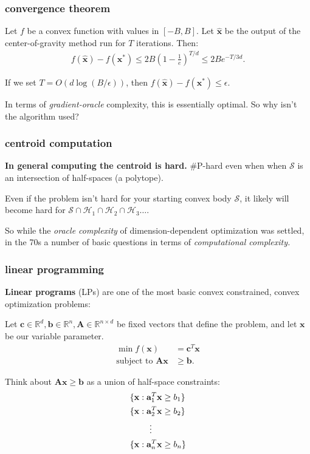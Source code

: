 \documentclass[compress]{beamer}
\newcommand{\bv}[1]{\mathbf{#1}}
\newcommand{\R}{\mathbb{R}}
\begin{document}
\begin{frame}[t]
	\frametitle{convergence theorem}
	\begin{theorem}
		Let $f$ be a convex function with values in $[-B,B]$.
		Let $\hat{\bv{x}}$ be the output of the center-of-gravity method run for $T$ iterations. Then:
		\begin{align*}
			f(\hat{\bv{x}}) - f(\bv{x}^*) \leq 2B \left(1-\frac{1}{e}\right)^{T/d} \leq 2B e^{-T/3d}.
		\end{align*}
	\end{theorem}
	If we set $T = O\left(d\log(B/\epsilon)\right)$, then $f(\hat{\bv{x}}) - f(\bv{x}^*) \leq \epsilon$. 

In terms of \emph{gradient-oracle} complexity, this is essentially optimal. So why isn't the algorithm used?
\end{frame}


\begin{frame}[t]
		\frametitle{centroid computation}
		\textbf{In general computing the centroid is hard.} \#P-hard even when when $\mathcal{S}$ is an intersection of half-spaces (a polytope).
		
		Even if the problem isn't hard for your starting convex body $\mathcal{S}$, it likely will become hard for $\mathcal{S} \cap \mathcal{H}_1  \cap \mathcal{H}_2 \cap \mathcal{H}_3 \ldots$. 
		
		So while the \emph{oracle complexity} of dimension-dependent optimization was settled, in the 70s a number of basic questions in terms of \emph{computational complexity.}
\end{frame}

\begin{frame}[t]
	\frametitle{linear programming}
	\textbf{Linear programs} (LPs) are one of the most basic convex constrained, convex optimization problems:
	
	Let $\bv{c}\in \R^d, \bv{b}\in \R^n, \bv{A}\in \R^{n\times d}$ be fixed vectors that define the problem, and let $\bv{x}$ be our variable parameter.
	\begin{align*}
	\min f(\bv{x}) &= \bv{c}^T\bv{x}\\
	\text{subject to } \bv{A}\bv{x} &\geq \bv{b}.
	\end{align*}
	
Think about $\bv{A}\bv{x} \geq \bv{b}$ as a union of half-space constraints:
\begin{align*}
	&\{\bv{x}: \bv{a}_1^T\bv{x} \geq {b}_1 \}\\
		&\{\bv{x}: \bv{a}_2^T\bv{x} \geq {b}_2 \}\\
			&\hspace{2.3em}\vdots\\
			&\{\bv{x}: \bv{a}_n^T\bv{x} \geq {b}_n \}
\end{align*}
	
\end{frame}
\end{document}
